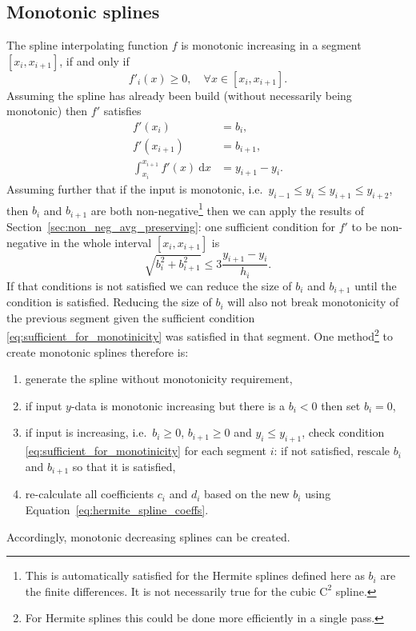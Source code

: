 \documentclass[11pt]{article}
\newcommand{\dd}{\:\text{d}}
\newcommand{\Co}{\mathrm{C}}
\theoremstyle{break}            %
\begin{document}
\subsection{Monotonic splines}
The spline interpolating function $f$ is monotonic increasing
in a segment $[x_i, x_{i+1}]$, if and only if
\begin{equation*}
    f'_i(x) \geq 0, \quad \forall x\in [x_i,x_{i+1}].
\end{equation*}
Assuming the spline has already been build
(without necessarily being monotonic) then $f'$ satisfies
\begin{equation*}
\begin{split}
    f'(x_i) & = b_i,\\
    f'(x_{i+1}) & = b_{i+1},\\
    \int_{x_i}^{x_{i+1}} f'(x) \dd x & = y_{i+1}-y_i.
\end{split}
\end{equation*}
Assuming further that if the input is monotonic, i.e.\
$y_{i-1}\leq y_i \leq y_{i+1} \leq y_{i+2}$, then $b_i$ and $b_{i+1}$
are both non-negative\footnote{This is automatically satisfied for the Hermite
splines defined here as $b_i$ are the finite differences. It is not
necessarily true for the cubic $\Co^2$ spline.}
then we can apply the results of Section~\ref{sec:non_neg_avg_preserving}:
one sufficient condition for $f'$ to be non-negative in the whole
interval $[x_i,x_{i+1}]$ is
\begin{equation}
\label{eq:sufficient_for_monotinicity}
   \sqrt{b_i^2+b_{i+1}^2} \leq 3 \frac{y_{i+1}-y_i}{h_i}.
\end{equation}
If that conditions is not satisfied we can reduce the size of $b_i$ and
$b_{i+1}$ until the condition is satisfied. Reducing the size of $b_i$
will also not break monotonicity of the previous segment given the
sufficient condition \eqref{eq:sufficient_for_monotinicity} was 
satisfied in that segment.
One method\footnote{For Hermite splines this could be done more
    efficiently in a single pass.}
to create monotonic splines therefore is: 
\begin{enumerate}
  \item generate the spline without monotonicity requirement,
  \item if input $y$-data is monotonic increasing
      but there is a $b_i<0$ then set $b_i=0$,
  \item if input is increasing, i.e.\
      $b_i\geq 0$, $b_{i+1}\geq 0$ and $y_i\leq y_{i+1}$,
      check condition \eqref{eq:sufficient_for_monotinicity}
      for each segment $i$: if not satisfied,
      rescale $b_i$ and $b_{i+1}$ so that it is satisfied,
  \item re-calculate all coefficients $c_i$ and $d_i$ based on the
      new $b_i$ using Equation~\eqref{eq:hermite_spline_coeffs}.
\end{enumerate}
Accordingly, monotonic decreasing splines can be created.
\end{document}
